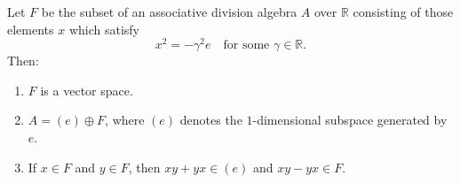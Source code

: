 Let $F$ be the subset of an associative division algebra $A$ over $\mathbb{R}$ consisting of those elements $x$ which satisfy
$$x^2 = -\gamma^2 e \quad \text{for some } \gamma \in \mathbb{R}.$$
Then:
\begin{enumerate}
    \item[(i)] $F$ is a vector space.
    \item[(ii)] $A = (e) \oplus F$, where $(e)$ denotes the $1$-dimensional subspace generated by $e$.
    \item[(iii)] If $x \in F$ and $y \in F$, then $xy + yx \in (e)$ and $xy - yx \in F$.
\end{enumerate}
